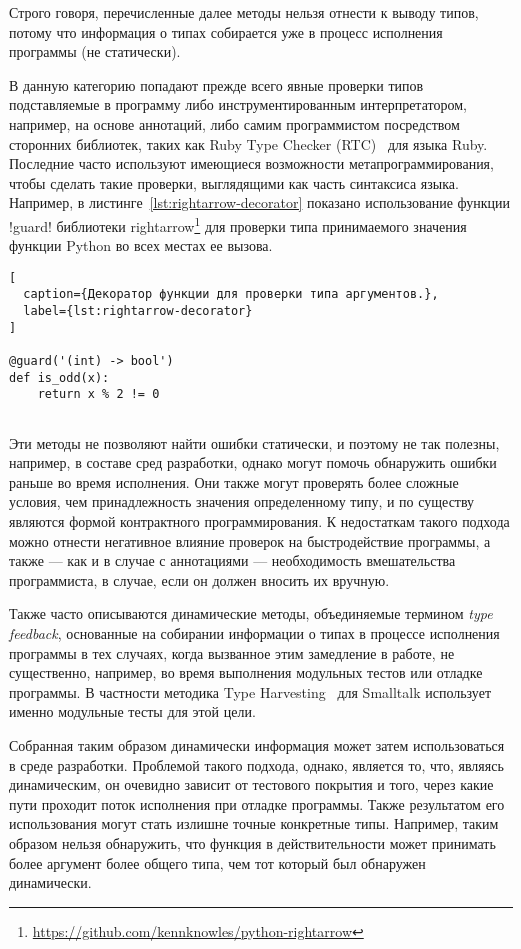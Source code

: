 Строго говоря, перечисленные далее методы нельзя отнести к выводу типов, потому
что информация о типах собирается уже в процесс исполнения программы (не
статически).

В данную категорию попадают прежде всего явные проверки типов подставляемые в
программу либо инструментированным интерпретатором, например, на основе
аннотаций, либо самим программистом посредством сторонних библиотек, таких как
Ruby Type Checker (RTC)~\cite{Ren2013} для языка Ruby. Последние часто
используют имеющиеся возможности метапрограммирования, чтобы сделать такие проверки,
выглядящими как часть синтаксиса языка. Например, в
листинге~\ref{lst:rightarrow-decorator} показано использование функции !guard!
библиотеки
rightarrow\footnote{\url{https://github.com/kennknowles/python-rightarrow}}
для проверки типа принимаемого значения функции Python во всех местах
ее вызова.

\begin{lstlisting}[
  caption={Декоратор функции для проверки типа аргументов.},
  label={lst:rightarrow-decorator}
]

@guard('(int) -> bool')
def is_odd(x):
    return x % 2 != 0
    
\end{lstlisting}


Эти методы не позволяют найти ошибки статически, и поэтому не так полезны,
например, в составе сред разработки, однако могут помочь обнаружить ошибки
раньше во время исполнения.  Они также могут проверять более сложные условия,
чем принадлежность значения определенному типу, и по существу являются формой
контрактного программирования.  К недостаткам такого подхода можно отнести
негативное влияние проверок на быстродействие программы, а также --- как и
в случае с аннотациями --- необходимость вмешательства программиста, в случае,
если он должен вносить их вручную.

Также часто описываются динамические методы, объединяемые термином \emph{type
  feedback}, основанные на собирании информации о типах в процессе исполнения
программы в тех случаях, когда вызванное этим замедление в работе, не
существенно, например, во время выполнения модульных тестов или отладке
программы. В частности методика Type Harvesting~\cite{Haupt2011}
для Smalltalk использует именно модульные тесты для этой цели.

Собранная таким образом динамически информация может затем использоваться в
среде разработки.  Проблемой такого подхода, однако, является то, что, являясь
динамическим, он очевидно зависит от тестового покрытия и того, через какие пути
проходит поток исполнения при отладке программы. Также результатом его
использования могут стать излишне точные конкретные типы. Например, таким
образом нельзя обнаружить, что функция в действительности может принимать более
аргумент более общего типа, чем тот который был обнаружен динамически.
